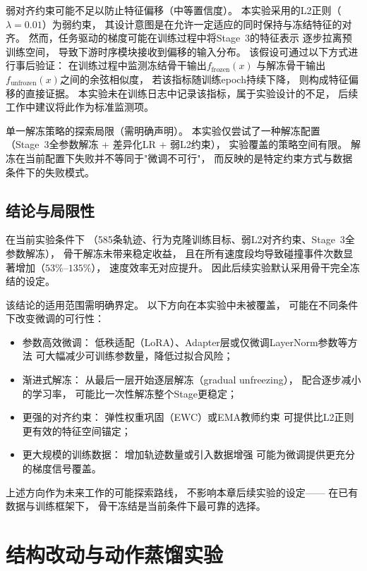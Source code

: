 弱对齐约束可能不足以防止特征偏移（中等置信度）。
本实验采用的L2正则（$\lambda=0.01$）为弱约束，
其设计意图是在允许一定适应的同时保持与冻结特征的对齐。
然而，任务驱动的梯度可能在训练过程中将Stage~3的特征表示
逐步拉离预训练空间，
导致下游时序模块接收到偏移的输入分布。
该假设可通过以下方式进行事后验证：
在训练过程中监测冻结骨干输出$f_{\text{frozen}}(x)$
与解冻骨干输出$f_{\text{unfrozen}}(x)$之间的余弦相似度，
若该指标随训练epoch持续下降，
则构成特征偏移的直接证据。
本实验未在训练日志中记录该指标，属于实验设计的不足，
后续工作中建议将此作为标准监测项。

单一解冻策略的探索局限（需明确声明）。
本实验仅尝试了一种解冻配置
（Stage~3全参数解冻 + 差异化LR + 弱L2约束），
实验覆盖的策略空间有限。
解冻在当前配置下失败并不等同于"微调不可行"，
而反映的是特定约束方式与数据条件下的失败模式。

\subsection{结论与局限性}

在当前实验条件下
（585条轨迹、行为克隆训练目标、弱L2对齐约束、Stage~3全参数解冻），
骨干解冻未带来稳定收益，
且在所有速度段均导致碰撞事件次数显著增加（$53\%$--$135\%$），
速度效率无对应提升。
因此后续实验默认采用骨干完全冻结的设定。

该结论的适用范围需明确界定。
以下方向在本实验中未被覆盖，
可能在不同条件下改变微调的可行性：
\begin{itemize}
  \item 参数高效微调：
    低秩适配（LoRA）、Adapter层或仅微调LayerNorm参数等方法
    可大幅减少可训练参数量，降低过拟合风险；
  \item 渐进式解冻：
    从最后一层开始逐层解冻（gradual unfreezing），
    配合逐步减小的学习率，
    可能比一次性解冻整个Stage更稳定；
  \item 更强的对齐约束：
    弹性权重巩固（EWC）或EMA教师约束
    可提供比L2正则更有效的特征空间锚定；
  \item 更大规模的训练数据：
    增加轨迹数量或引入数据增强
    可能为微调提供更充分的梯度信号覆盖。
\end{itemize}

上述方向作为未来工作的可能探索路线，
不影响本章后续实验的设定——
在已有数据与训练框架下，
骨干冻结是当前条件下最可靠的选择。

\FloatBarrier


\section{结构改动与动作蒸馏实验}
\label{sec:ch5_structure_kd}

